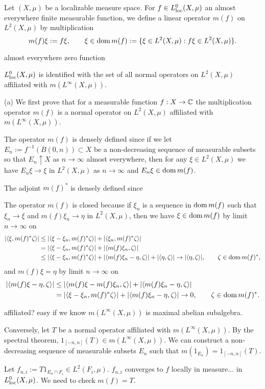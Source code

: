 \documentclass{../../large}
\begin{document}
\begin{prb}
Let $(X,\mu)$ be a localizable measure space.
For $f\in L_{\mathrm{loc}}^0(X,\mu)$ an almost everywhere finite measurable function, we define a linear operator $m(f)$ on $L^2(X,\mu)$ by multiplication
\[m(f)\xi:=f\xi,\qquad \xi\in\operatorname{dom} m(f):=\{\xi\in L^2(X,\mu):f\xi\in L^2(X,\mu)\}.\]

almost everywhere zero function
\begin{parts}
\item $L^0_{\mathrm{loc}}(X,\mu)$ is identified with the set of all normal operators on $L^2(X,\mu)$ affiliated with $m(L^\infty(X,\mu))$.
\end{parts}
\end{prb}
\begin{pf}
(a)
We first prove that for a measurable function $f:X\to\mathbb{C}$ the multiplication operator $m(f)$ is a normal operator on $L^2(X,\mu)$ affiliated with $m(L^\infty(X,\mu))$.

The operator $m(f)$ is densely defined since if we let $E_n:=f^{-1}(B(0,n))\subset X$ be a non-decreasing sequence of measurable subsets so that $E_n\uparrow X$ as $n\to\infty$ almost everywhere, then for any $\xi\in L^2(X,\mu)$ we have $E_n\xi\to\xi$ in $L^2(X,\mu)$ as $n\to\infty$ and $E_n\xi\in\operatorname{dom} m(f)$.

The adjoint $m(f)^*$ is densely defined since

The operator $m(f)$ is closed because if $\xi_n$ is a sequence in $\operatorname{dom} m(f)$ such that $\xi_n\to\xi$ and $m(f)\xi_n\to\eta$ in $L^2(X,\mu)$, then we have $\xi\in\operatorname{dom} m(f)$ by limit $n\to\infty$ on
\begin{align*}
|\langle\xi,m(f)^*\zeta\rangle|
&\le|\langle\xi-\xi_n,m(f)^*\zeta\rangle|+|\langle\xi_n,m(f)^*\zeta\rangle|\\
&=|\langle\xi-\xi_n,m(f)^*\zeta\rangle|+|\langle m(f)\xi_n,\zeta\rangle|\\
&\le|\langle\xi-\xi_n,m(f)^*\zeta\rangle|+|\langle m(f)\xi_n-\eta,\zeta\rangle|+|\langle\eta,\zeta\rangle|\to|\langle\eta,\zeta\rangle|,\qquad\zeta\in\operatorname{dom} m(f)^*,
\end{align*}
and $m(f)\xi=\eta$ by limit $n\to\infty$ on
\begin{align*}
|\langle m(f)\xi-\eta,\zeta\rangle|
&\le|\langle m(f)\xi-m(f)\xi_n,\zeta\rangle|+|\langle m(f)\xi_n-\eta,\zeta\rangle|\\
&=|\langle\xi-\xi_n,m(f)^*\zeta\rangle|+|\langle m(f)\xi_n-\eta,\zeta\rangle|\to0,\qquad\zeta\in\operatorname{dom} m(f)^*.
\end{align*}

affiliated? easy if we know $m(L^\infty(X,\mu))$ is maximal abelian subalgebra.


Conversely, let $T$ be a normal operator affiliated with $m(L^\infty(X,\mu))$.
By the spectral theorem, $1_{[-n,n]}(T)\in m(L^\infty(X,\mu))$.
We can construct a non-decreasing sequence of measurable subsets $E_n$ such that $m(1_{E_n})=1_{[-n,n]}(T)$.



Let $f_{n,i}:=T1_{E_n\cap F_i}\in L^2(F_i,\mu)$.
$f_{n,i}$ converges to $f$ locally in measure... in $L^0_{\mathrm{loc}}(X,\mu)$.
We need to check $m(f)=T$.

\end{pf}
\end{document}

